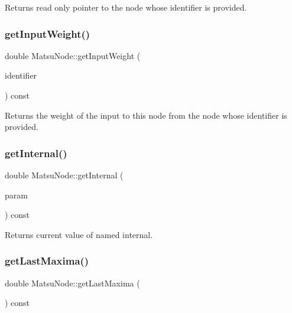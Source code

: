 Returns read only pointer to the node whose identifier is provided. 

\mbox{\label{classMatsuNode_ab6453259b47395fc6f32ccb35c130fd5}} 
\subsubsection{\texorpdfstring{get\+Input\+Weight()}{getInputWeight()}}
{\footnotesize\ttfamily double Matsu\+Node\+::get\+Input\+Weight (\begin{DoxyParamCaption}\item[{unsigned}]{identifier }\end{DoxyParamCaption}) const}



Returns the weight of the input to this node from the node whose identifier is provided. 

\mbox{\label{classMatsuNode_a64c0041dc1101a030f2d4f83468592fa}} 
\subsubsection{\texorpdfstring{get\+Internal()}{getInternal()}}
{\footnotesize\ttfamily double Matsu\+Node\+::get\+Internal (\begin{DoxyParamCaption}\item[{\mbox{\hyperlink{classMatsuNode_a5899aeb63b46cd45b1dc825ad518289a}{matsu\+Internal}}}]{param }\end{DoxyParamCaption}) const}



Returns current value of named internal. 

\mbox{\label{classMatsuNode_a5fa6c216b47aa2c433366093f48efe2a}} 
\subsubsection{\texorpdfstring{get\+Last\+Maxima()}{getLastMaxima()}}
{\footnotesize\ttfamily double Matsu\+Node\+::get\+Last\+Maxima (\begin{DoxyParamCaption}{ }\end{DoxyParamCaption}) const}




